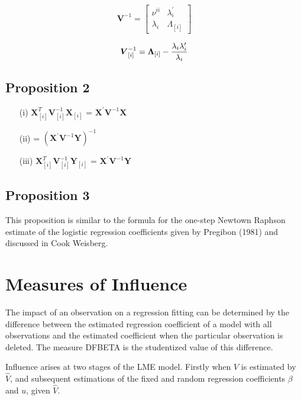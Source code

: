 \documentclass[12pt, a4paper]{report}
\theoremstyle{plain}
\theoremstyle{definition}
\theoremstyle{remark}
\begin{document}
\[
\boldsymbol{V}^{-1} =
\left[ \begin{array}{cc}
\nu^{ii} & \lambda_{i}^{\prime}  \\
\lambda_{i} & \Lambda_{[i]}
\end{array}\right] \]


\[\boldsymbol{V}_{[i]}^{-1} = \boldsymbol{\Lambda}_{[i]} - { \lambda_{i} \lambda_{i} ^{\prime} \over \lambda_{i} } \]

\subsection{Proposition 2}

\begin{itemize}
\item[(i)] $ \boldsymbol{X}_{[i]}^{T}\boldsymbol{V}^{-1}_{[i]}\boldsymbol{X}_{[i]}$ = $\boldsymbol{X}^{\prime}\boldsymbol{V}^{-1}\boldsymbol{X}$
\item[(ii)] = $(\boldsymbol{X}^{\prime}\boldsymbol{V}^{-1}\boldsymbol{Y})^{-1}$
\item[(iii)] $ \boldsymbol{X}_{[i]}^{T}\boldsymbol{V}^{-1}_{[i]}\boldsymbol{Y}_{[i]}$ = $\boldsymbol{X}^{\prime}\boldsymbol{V}^{-1}\boldsymbol{Y}$
\end{itemize}
\subsection{Proposition 3}
This proposition is similar to the formula for the one-step Newtown Raphson estimate of the logistic regression coefficients given by Pregibon (1981) and discussed in Cook Weisberg.



\newpage
\section{Measures of Influence} %

The impact of an observation on a regression fitting can be determined by the difference between the estimated regression coefficient of a model with all observations and the estimated coefficient when the particular observation is deleted. The measure DFBETA is the studentized value of this difference.

Influence arises at two stages of the LME model. Firstly when $V$ is estimated by $\hat{V}$, and subsequent
estimations of the fixed and random regression coefficients $\beta$ and $u$, given $\hat{V}$.
\end{document}
